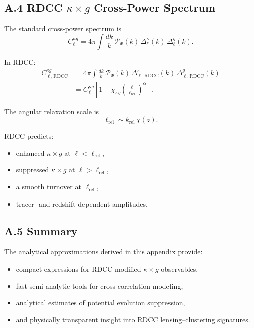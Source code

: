 \documentclass[11pt,a4paper]{article}
\begin{document}
\subsection*{A.4 RDCC \texorpdfstring{$\kappa\times g$}{κ×g} Cross-Power Spectrum}

The standard cross-power spectrum is
\begin{equation}
    C_{\ell}^{\kappa g}
    = 4\pi \int \frac{dk}{k}\,
      \mathcal{P}_{\Phi}(k)\,
      \Delta_{\ell}^{\kappa}(k)\,
      \Delta_{\ell}^{g}(k).
\end{equation}

In RDCC:
\begin{align}
    C_{\ell,\mathrm{RDCC}}^{\kappa g}
    &= 4\pi \int \frac{dk}{k}\,
       \mathcal{P}_{\Phi}(k)\,
       \Delta_{\ell,\mathrm{RDCC}}^{\kappa}(k)\,
       \Delta_{\ell,\mathrm{RDCC}}^{g}(k) \\
    &= C_{\ell}^{\kappa g}
       \left[
         1 - \chi_{\kappa g}
         \left(\frac{\ell}{\ell_{\mathrm{rel}}}\right)^{\alpha}
       \right].
\end{align}

The angular relaxation scale is
\begin{equation}
    \ell_{\mathrm{rel}}
    \sim k_{\mathrm{rel}}\,\chi(z).
\end{equation}

RDCC predicts:

\begin{itemize}
    \item enhanced $\kappa \times g$ at $\ell < \ell_{\mathrm{rel}}$,
    \item suppressed $\kappa \times g$ at $\ell > \ell_{\mathrm{rel}}$,
    \item a smooth turnover at $\ell_{\mathrm{rel}}$,
    \item tracer- and redshift-dependent amplitudes.
\end{itemize}

\subsection*{A.5 Summary}

The analytical approximations derived in this appendix provide:

\begin{itemize}
    \item compact expressions for RDCC-modified $\kappa \times g$ observables,
    \item fast semi-analytic tools for cross-correlation modeling,
    \item analytical estimates of potential evolution suppression,
    \item and physically transparent insight into RDCC lensing–clustering signatures.
\end{itemize}
\end{document}
